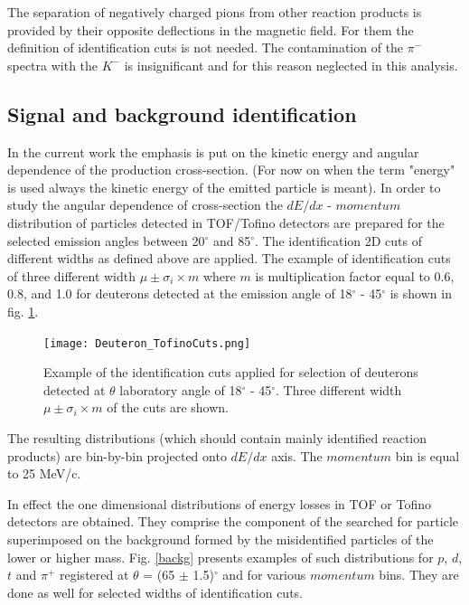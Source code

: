   The separation of negatively charged pions from other reaction products is provided by their opposite deflections in the magnetic field. 
  For them the definition of identification cuts is not needed. The contamination of the $\pi^{-}$ spectra with the $K^{-}$ is insignificant and for this reason neglected in this analysis.


\subsection{\label{Back_sub} Signal and background identification}

In the current work the emphasis is put on the kinetic energy and angular dependence 
of the production cross-section.
(For now on when the term "energy" is used always the kinetic energy of the emitted particle is meant).   
In order to study the angular dependence of cross-section 
the $dE/dx$ - $momentum$ distribution of particles detected in TOF/Tofino detectors
are prepared for the selected emission angles between 
20$^{\circ}$ and 85$^{\circ}$.
The identification 2D cuts of different widths as defined above are applied. The example of identification cuts of three different width $\mu\pm\sigma_i\times m$ where $m$ is multiplication factor equal to 0.6, 0.8, and 1.0 for deuterons detected at the emission angle of  18$^\circ$ - 45$^\circ$ is shown in fig.  \ref{deuteron_cuts_tofino}. \\
\begin{figure}[!ht]
    \centering
    \texttt{[image: Deuteron\_TofinoCuts.png]}
    \caption{Example of the identification cuts applied for selection of deuterons detected at $\theta$ laboratory angle of 18$^\circ$ - 45$^\circ$. Three different width $\mu\pm\sigma_i\times m$ of the cuts are shown.}
    \label{deuteron_cuts_tofino}
\end{figure}
The resulting distributions (which should contain mainly identified reaction products)  
are bin-by-bin projected onto $dE/dx$ axis. The $momentum$ bin is equal to 25 MeV/c.

In effect the one dimensional distributions of energy losses in TOF or Tofino detectors are obtained.
They comprise the component of the searched for particle superimposed on the background formed by the 
misidentified particles of the lower or higher mass. Fig. \ref{backg} presents examples of such distributions   
for $p$, $d$, $t$ and $\pi^+$  registered at $\theta$ = (65 $\pm$ 1.5)$^{\circ}$ and for various $momentum$ bins.
They are done as well for selected widths of identification cuts.

